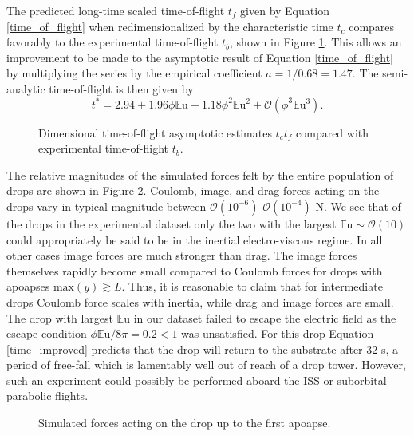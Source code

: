 \documentclass[12pt,a4paper,oneside]{book}
\begin{document}
The predicted long-time scaled time-of-flight $t_f$ given by Equation \ref{time_of_flight} when redimensionalized by the characteristic time $t_c$ compares favorably to the experimental time-of-flight $t_b$, shown in Figure \ref{fig:times2}. This allows an improvement to be made to the asymptotic result of Equation \ref{time_of_flight} by multiplying the series by the empirical coefficient $a = 1/0.68 = 1.47$. The semi-analytic time-of-flight is then given by
\begin{equation}
\label{time_improved}
t^* = 2.94 + 1.96\phi\mathbb{E}\mbox{u} + 1.18\phi^2\mathbb{E}\mbox{u}^{2} + \mathcal{O}(\phi^3\mathbb{E}\mbox{u}^{3}).
\end{equation}
\begin{figure}[htb]
    \centering
    
    \caption{Dimensional time-of-flight asymptotic estimates $t_c t_f$ compared with experimental time-of-flight $t_b$.\label{fig:times2}}
\end{figure}

The relative magnitudes of the simulated forces felt by the entire population of drops are shown in Figure \ref{fig:forces}. Coulomb, image, and drag forces acting on the drops vary in typical magnitude between $\mathcal{O}(10^{-6})$-$\mathcal{O}(10^{-4})$ N. We see that of the drops in the experimental dataset only the two with the largest $\mathbb{E}\mbox{u} \sim \mathcal{O}(10)$ could appropriately be said to be in the inertial electro-viscous regime. In all other cases image forces are much stronger than drag. The image forces themselves rapidly become small compared to Coulomb forces for drops with apoapses $\mbox{max}\left( y\right) \gtrsim L$. Thus, it is reasonable to claim that for intermediate drops Coulomb force scales with inertia, while drag and image forces are small. The drop with largest $\mathbb{E}\mbox{u}$ in our dataset failed to escape the electric field as the escape condition $\phi \mathbb{E}\mbox{u} / 8\pi = 0.2 < 1$ was unsatisfied. For this drop Equation \ref{time_improved} predicts that the drop will return to the substrate after 32 s, a period of free-fall which is lamentably well out of reach of a drop tower. However, such an experiment could possibly be performed aboard the ISS or suborbital parabolic flights.
\begin{figure}[!htb]
    \centering
    \resizebox{14cm}{!}{}
    \caption{Simulated forces acting on the drop up to the first apoapse.\label{fig:forces}}
\end{figure}
\end{document}
